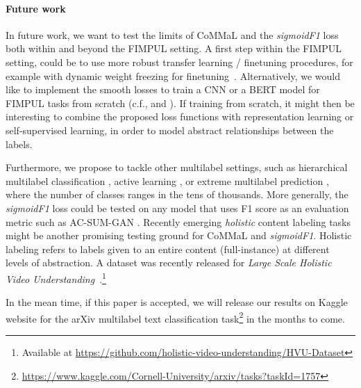 \paragraph{Future work}
In future work, we want to test the limits of CoMMaL and the \emph{sigmoidF1} loss both within and beyond the FIMPUL setting.
%
A first step within the FIMPUL setting, could be to use more robust transfer learning / finetuning procedures, for example with dynamic weight freezing for finetuning~\cite{ULMFit}. Alternatively, we would like to implement the smooth losses to train a CNN or a BERT model for FIMPUL tasks from scratch (c.f., \cite{tencent} and \cite{focalLoss}). If training from scratch, it might then be interesting to combine the proposed loss functions with representation learning \cite{unsupervisedImage,highResRepresentation} or self-supervised learning, in order to model abstract relationships between the labels.

Furthermore, we propose to tackle other multilabel settings, such as hierarchical multilabel classification \cite{HARAM}, active learning \cite{activeLearningMultiLabel}, or extreme multilabel prediction \cite{extremeMultilabelText, extremeSIGIR}, where the number of classes ranges in the tens of thousands. More generally, the \emph{sigmoidF1} loss could be tested on any model that uses F1 score as an evaluation metric such as AC-SUM-GAN \cite{AC-SUM-GAN}.
Recently emerging \textit{holistic} content labeling tasks might be another promising testing ground for CoMMaL and \emph{sigmoidF1}. Holistic labeling refers to labels given to an entire content (full-instance) at different levels of abstraction. A dataset was recently released for \emph{Large Scale Holistic Video Understanding}~\cite{holisticVideoData}.\footnote{Available at \url{https://github.com/holistic-video-understanding/HVU-Dataset}}
\vspace{\baselineskip}

In the mean time, if this paper is accepted, we will release our results on Kaggle website for the arXiv multilabel text classification task\footnote{\url{https://www.kaggle.com/Cornell-University/arxiv/tasks?taskId=1757}} in the months to come.
\fi



